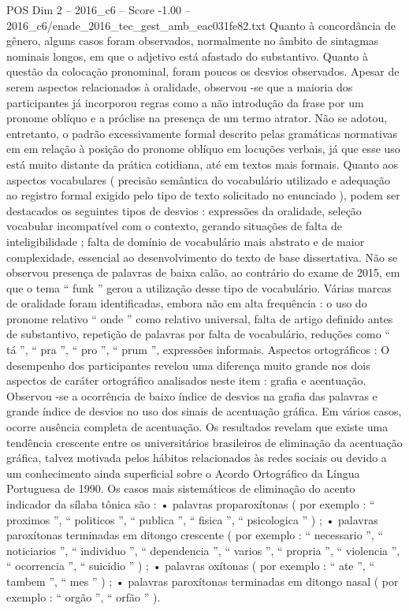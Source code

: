 \begin{textsample}{POS Dim 2 – 2016\_c6 – Score -1.00 – 2016\_c6/enade\_2016\_tec\_gest\_amb\_eac031fe82.txt}
Quanto à concordância de gênero, alguns casos foram observados, normalmente no âmbito de sintagmas nominais longos, em que o adjetivo está afastado do substantivo.
Quanto à questão da colocação pronominal, foram poucos os desvios observados.
Apesar de serem aspectos relacionados à oralidade, observou -se que a maioria dos participantes já incorporou regras como a não introdução da frase por um pronome oblíquo e a próclise na presença de um termo atrator.
Não se adotou, entretanto, o padrão excessivamente formal descrito pelas gramáticas normativas em em relação à posição do pronome oblíquo em locuções verbais, já que esse uso está muito distante da prática cotidiana, até em textos mais formais.
Quanto aos aspectos vocabulares ( precisão semântica do vocabulário utilizado e adequação ao registro formal exigido pelo tipo de texto solicitado no enunciado ), podem ser destacados os seguintes tipos de desvios : expressões da oralidade, seleção vocabular incompatível com o contexto, gerando situações de falta de inteligibilidade ; falta de domínio de vocabulário mais abstrato e de maior complexidade, essencial ao desenvolvimento do texto de base dissertativa.
Não se observou presença de palavras de baixa calão, ao contrário do exame de 2015, em que o tema “ funk ” gerou a utilização desse tipo de vocabulário.
Várias marcas de oralidade foram identificadas, embora não em alta frequência : o uso do pronome relativo “ onde ” como relativo universal, falta de artigo definido antes de substantivo, repetição de palavras por falta de vocabulário, reduções como “ tá ”, “ pra ”, “ pro ”, “ prum ”, expressões informais.
Aspectos ortográficos : O desempenho dos participantes revelou uma diferença muito grande nos dois aspectos de caráter ortográfico analisados neste item : grafia e acentuação.
Observou -se a ocorrência de baixo índice de desvios na grafia das palavras e grande índice de desvios no uso dos sinais de acentuação gráfica.
Em vários casos, ocorre ausência completa de acentuação.
Os resultados revelam que existe uma tendência crescente entre os universitários brasileiros de eliminação da acentuação gráfica, talvez motivada pelos hábitos relacionados às redes sociais ou devido a um conhecimento ainda superficial sobre o Acordo Ortográfico da Língua Portuguesa de 1990.
Os casos mais sistemáticos de eliminação do acento indicador da sílaba tônica são : • palavras proparoxítonas ( por exemplo : “ proximos ”, “ politicos ”, “ publica ”, “ fisica ”, “ psicologica ” ) ; • palavras paroxítonas terminadas em ditongo crescente ( por exemplo : “ necessario ”, “ noticiarios ”, “ individuo ”, “ dependencia ”, “ varios ”, “ propria ”, “ violencia ”, “ ocorrencia ”, “ suicidio ” ) ; • palavras oxítonas ( por exemplo : “ ate ”, “ tambem ”, “ mes ” ) ; • palavras paroxítonas terminadas em ditongo nasal ( por exemplo : “ orgão ”, “ orfão ” ).

\end{textsample}
